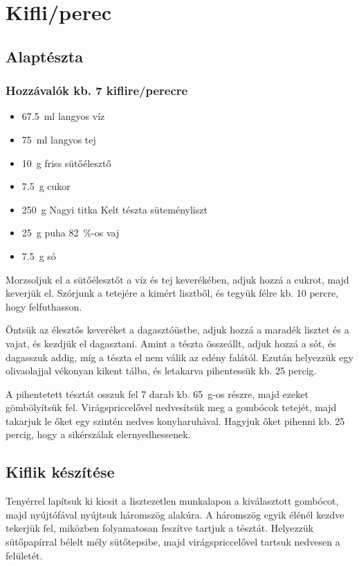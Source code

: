 \newpage
\section*{Kifli/perec} \label{sec:kifli-perec}

\subsection*{Alaptészta}
\subsubsection*{Hozzávalók kb. 7 kiflire/perecre}
\begin{itemize}
    \item \qty{67.5}{\ml} langyos víz
    \item \qty{75}{\ml} langyos tej
    \item \qty{10}{\g} friss sütőélesztő
    \item \qty{7.5}{\g} cukor
    \item \qty{250}{\g} Nagyi titka Kelt tészta süteményliszt
    \item \qty{25}{\g} puha \qty{82}{\percent}-os vaj
    \item \qty{7.5}{\g} só
\end{itemize}

Morzsoljuk el a sütőélesztőt a víz és tej keverékében, adjuk hozzá a cukrot, majd keverjük el. Szórjunk a tetejére a kimért lisztből, és tegyük félre kb. \num{10} percre, hogy felfuthasson.

Öntsük az élesztős keveréket a dagasztóüstbe, adjuk hozzá a maradék lisztet és a vajat, és kezdjük el dagasztani. Amint a tészta összeállt, adjuk hozzá a sót, és dagasszuk addig, míg a tészta el nem válik az edény falától. Ezután helyezzük egy olivaolajjal vékonyan kikent tálba, és letakarva pihentessük kb. \num{25} percig.

A pihentetett tésztát osszuk fel \num{7} darab kb. \qty{65}{\g}-os részre, majd ezeket gömbölyítsük fel. Virágspriccelővel nedvesítsük meg a gombócok tetejét, majd takarjuk le őket egy szintén nedves konyharuhával. Hagyjuk őket pihenni kb. \num{25} percig, hogy a sikérszálak elernyedhessenek.~\cite{szabi_kifli}

\subsection*{Kiflik készítése}
Tenyérrel lapítsuk ki kicsit a lisztezetlen munkalapon a kiválasztott gombócot, majd nyújtófával nyújtsuk háromszög alakúra. A háromszög egyik élénél kezdve tekerjük fel, miközben folyamatosan feszítve tartjuk a tésztát. Helyezzük sütőpapírral bélelt mély sütőtepsibe, majd virágspriccelővel tartsuk nedvesen a felületét.

